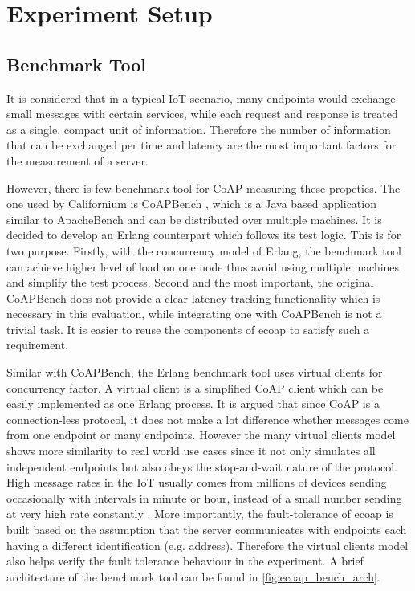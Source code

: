 \section{Experiment Setup}

\subsection{Benchmark Tool}

It is considered that in a typical IoT scenario, many endpoints would exchange small messages with certain services, while each request and response is treated as a single, compact unit of information. Therefore the number of information that can be exchanged per time and latency are the most important factors for the measurement of a server.

However, there is few benchmark tool for CoAP measuring these propeties. The one used by Californium is CoAPBench \autocite{coapbench}, which is a Java based application similar to ApacheBench \autocite{apachebench} and can be distributed over multiple machines. It is decided to develop an Erlang counterpart which follows its test logic. This is for two purpose. Firstly, with the concurrency model of Erlang, the benchmark tool can achieve higher level of load on one node thus avoid using multiple machines and simplify the test process. Second and the most important, the original CoAPBench does not provide a clear latency tracking functionality which is necessary in this evaluation, while integrating one with CoAPBench is not a trivial task. It is easier to reuse the components of ecoap to satisfy such a requirement. 

Similar with CoAPBench, the Erlang benchmark tool uses virtual clients for concurrency factor. A virtual client is a simplified CoAP client which can be easily implemented as one Erlang process. It is argued that since CoAP is a connection-less protocol, it does not make a lot difference whether messages come from one endpoint or many endpoints. However the many virtual clients model shows more similarity to real world use cases since it not only simulates all independent endpoints but also obeys the stop-and-wait nature of the protocol. High message rates in the IoT usually comes from millions of devices sending occasionally with intervals in minute or hour, instead of a small number sending at very high rate constantly \autocite{kovatsch2015scalable}. More importantly, the fault-tolerance of ecoap is built based on the assumption that the server communicates with endpoints each having a different identification (e.g. address). Therefore the virtual clients model also helps verify the fault tolerance behaviour in the experiment. A brief architecture of the benchmark tool can be found in \autoref{fig:ecoap_bench_arch}.

